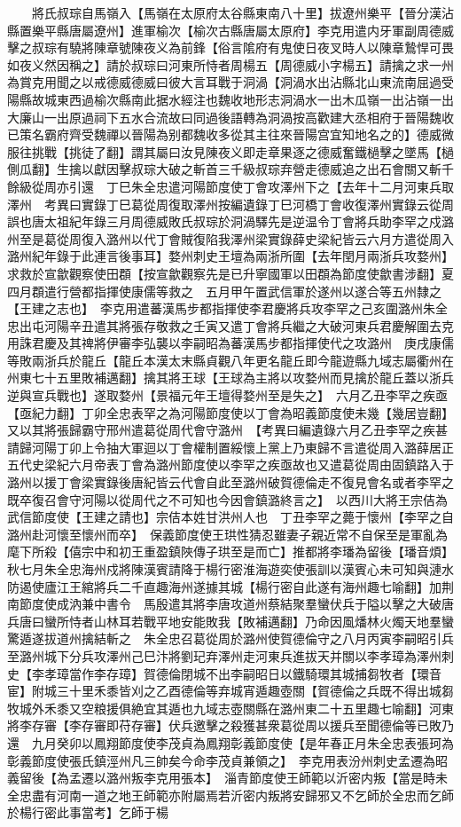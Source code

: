 　　將氏叔琮自馬嶺入【馬嶺在太原府太谷縣東南八十里】拔遼州樂平【晉分漢沾縣置樂平縣唐屬遼州】進軍榆次【榆次古縣唐屬太原府】李克用遣内牙軍副周德威擊之叔琮有驍將陳章號陳夜义為前鋒【俗言隂府有鬼使日夜叉時人以陳章鷙悍可畏如夜义然因稱之】請於叔琮曰河東所恃者周楊五【周德威小字楊五】請擒之求一州為賞克用聞之以戒德威德威曰彼大言耳戰于洞渦【洞渦水出沾縣北山東流南屈過受陽縣故城東西過榆次縣南此据水經注也魏收地形志洞渦水一出木瓜嶺一出沾嶺一出大廉山一出原過祠下五水合流故曰同過後語轉為洞渦按高歡建大丞相府于晉陽魏收已策名霸府齊受魏禪以晉陽為别都魏收多從其主往來晉陽宫宜知地名之的】德威微服往挑戰【挑徒了翻】謂其屬曰汝見陳夜义即走章果逐之德威奮鐵檛擊之墜馬【檛側瓜翻】生擒以獻因擊叔琮大破之斬首三千級叔琮弃營走德威追之出石會關又斬千餘級從周亦引還　丁巳朱全忠遣河陽節度使丁會攻澤州下之【去年十二月河東兵取澤州　考異曰實錄丁巳葛從周復取澤州按編遺錄丁巳河橋丁會收復澤州實錄云從周誤也唐太祖紀年錄三月周德威敗氏叔琮於洞渦驛先是逆温令丁會將兵助李罕之戍潞州至是葛從周復入潞州以代丁會賊復陷我澤州梁實錄薛史梁紀皆云六月方遣從周入潞州紀年錄于此連言後事耳】婺州刺史王壇為兩浙所圍【去年閏月兩浙兵攻婺州】求救於宣歙觀察使田頵【按宣歙觀察先是已升寧國軍以田頵為節度使歙書涉翻】夏四月頵遣行營都指揮使康儒等救之　五月甲午置武信軍於遂州以遂合等五州隸之【王建之志也】　李克用遣蕃漢馬步都指揮使李君慶將兵攻李罕之己亥圍潞州朱全忠出屯河陽辛丑遣其將張存敬救之壬寅又遣丁會將兵繼之大破河東兵君慶解圍去克用誅君慶及其禆將伊審李弘襲以李嗣昭為蕃漢馬步都指揮使代之攻潞州　庚戌康儒等敗兩浙兵於龍丘【龍丘本漢太末縣貞觀八年更名龍丘即今龍遊縣九域志屬衢州在州東七十五里敗補邁翻】擒其將王球【王球為主將以攻婺州而見擒於龍丘蓋以浙兵逆與宣兵戰也】遂取婺州【景福元年王壇得婺州至是失之】　六月乙丑李罕之疾亟【亟紀力翻】丁卯全忠表罕之為河陽節度使以丁會為昭義節度使未幾【幾居豈翻】又以其將張歸霸守邢州遣葛從周代會守潞州　【考異曰編遺錄六月乙丑李罕之疾甚請歸河陽丁卯上令抽大軍迴以丁會權制置綏懷上黨上乃東歸不言遣從周入潞薛居正五代史梁紀六月帝表丁會為潞州節度使以李罕之疾亟故也又遣葛從周由固鎮路入于潞州以援丁會梁實錄後唐紀皆云代會自此至潞州破賀德倫走不復見會名或者李罕之既卒復召會守河陽以從周代之不可知也今因會鎮潞終言之】　以西川大將王宗佶為武信節度使【王建之請也】宗佶本姓甘洪州人也　丁丑李罕之薨于懷州【李罕之自潞州赴河懷至懷州而卒】　保義節度使王珙性猜忍雖妻子親近常不自保至是軍亂為麾下所殺【僖宗中和初王重盈鎮陜傳子珙至是而亡】推都將李璠為留後【璠音煩】　秋七月朱全忠海州戍將陳漢賓請降于楊行密淮海遊奕使張訓以漢賓心未可知與漣水防遏使廬江王綰將兵二千直趣海州遂據其城【楊行密自此遂有海州趣七喻翻】加荆南節度使成汭兼中書令　馬殷遣其將李唐攻道州蔡結聚羣蠻伏兵于隘以擊之大破唐兵唐曰蠻所恃者山林耳若戰平地安能敗我【敗補邁翻】乃命因風燔林火燭天地羣蠻驚遁遂拔道州擒結斬之　朱全忠召葛從周於潞州使賀德倫守之八月丙寅李嗣昭引兵至潞州城下分兵攻澤州己巳汴將劉玘弃澤州走河東兵進拔天并關以李孝璋為澤州刺史【李孝璋當作李存璋】賀德倫閉城不出李嗣昭日以鐵騎環其城捕芻牧者【環音宦】附城三十里禾黍皆刈之乙酉德倫等弃城宵遁趣壺關【賀德倫之兵既不得出城芻牧城外禾黍又空粮援俱絶宜其遁也九域志壺關縣在潞州東二十五里趣七喻翻】河東將李存審【李存審即苻存審】伏兵邀擊之殺獲甚衆葛從周以援兵至聞德倫等已敗乃還　九月癸卯以鳳翔節度使李茂貞為鳳翔彰義節度使【是年春正月朱全忠表張珂為彰義節度使張氏鎮涇州凡三帥矣今命李茂貞兼領之】　李克用表汾州刺史孟遷為昭義留後【為孟遷以潞州叛李克用張本】　淄青節度使王師範以沂密内叛【當是時未全忠盡有河南一道之地王師範亦附屬焉若沂密内叛將安歸邪又不乞師於全忠而乞師於楊行密此事當考】乞師于楊
